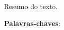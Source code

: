 

\begin{resumo}
	\SingleSpacing
	
	Resumo do texto.
	
	\noindent 
	\textbf{Palavras-chaves}: \PalavraschaveTexto
\end{resumo}


